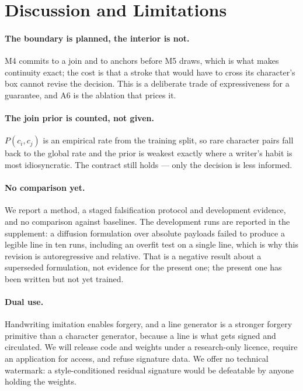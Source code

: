 \documentclass[conference]{IEEEtran}
\begin{document}
\section{Discussion and Limitations}

\paragraph{The boundary is planned, the interior is not.} M4 commits to a join and to anchors
before M5 draws, which is what makes continuity exact; the cost is that a stroke that would
have to cross its character's box cannot revise the decision. This is a deliberate trade of
expressiveness for a guarantee, and A6 is the ablation that prices it.

\paragraph{The join prior is counted, not given.} $P(c_i,c_{j})$ is an empirical rate from the
training split, so rare character pairs fall back to the global rate and the prior is weakest
exactly where a writer's habit is most idiosyncratic. The contract still holds --- only the
decision is less informed.

\paragraph{No comparison yet.} We report a method, a staged falsification protocol and
development evidence, and no comparison against baselines. The development runs are reported in
the supplement: a diffusion formulation over absolute payloads failed to produce a legible line
in ten runs, including an overfit test on a single line, which is why this revision is
autoregressive and relative. That is a negative result about a superseded formulation, not
evidence for the present one; the present one has been written but not yet trained.

\paragraph{Dual use.} Handwriting imitation enables forgery, and a line generator is a
stronger forgery primitive than a character generator, because a line is what gets signed and
circulated. We will release code and weights under a research-only licence, require an
application for access, and refuse signature data. We offer no technical watermark: a
style-conditioned residual signature would be defeatable by anyone holding the weights.
\end{document}

